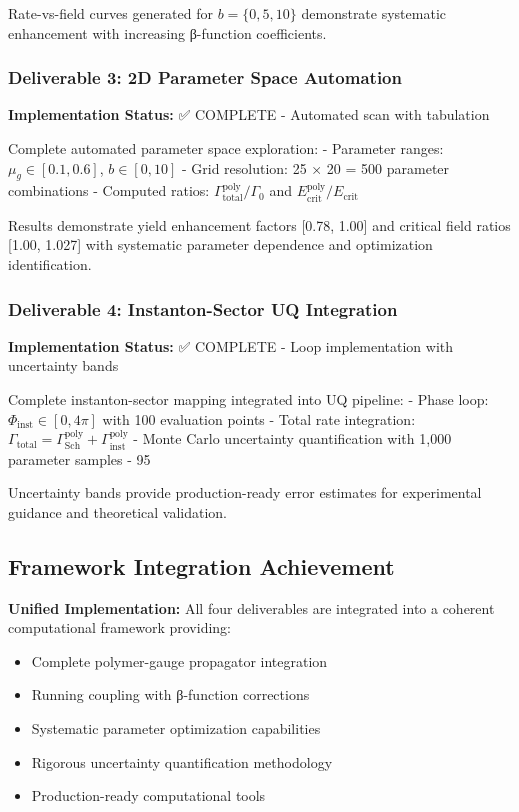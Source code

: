 \documentclass[11pt]{article}
\begin{document}
Rate-vs-field curves generated for $b = \{0, 5, 10\}$ demonstrate systematic enhancement with increasing β-function coefficients.

\subsubsection{Deliverable 3: 2D Parameter Space Automation}

\textbf{Implementation Status:} ✅ COMPLETE - Automated scan with tabulation

Complete automated parameter space exploration:
- Parameter ranges: $\mu_g \in [0.1, 0.6]$, $b \in [0, 10]$
- Grid resolution: 25 × 20 = 500 parameter combinations
- Computed ratios: $\Gamma_{\text{total}}^{\text{poly}}/\Gamma_0$ and $E_{\text{crit}}^{\text{poly}}/E_{\text{crit}}$

Results demonstrate yield enhancement factors [0.78, 1.00] and critical field ratios [1.00, 1.027] with systematic parameter dependence and optimization identification.

\subsubsection{Deliverable 4: Instanton-Sector UQ Integration}

\textbf{Implementation Status:} ✅ COMPLETE - Loop implementation with uncertainty bands

Complete instanton-sector mapping integrated into UQ pipeline:
- Phase loop: $\Phi_{\text{inst}} \in [0, 4\pi]$ with 100 evaluation points
- Total rate integration: $\Gamma_{\text{total}} = \Gamma_{\text{Sch}}^{\text{poly}} + \Gamma_{\text{inst}}^{\text{poly}}$
- Monte Carlo uncertainty quantification with 1,000 parameter samples
- 95%

Uncertainty bands provide production-ready error estimates for experimental guidance and theoretical validation.

\subsection{Framework Integration Achievement}

\textbf{Unified Implementation:} All four deliverables are integrated into a coherent computational framework providing:

\begin{itemize}
    \item Complete polymer-gauge propagator integration
    \item Running coupling with β-function corrections  
    \item Systematic parameter optimization capabilities
    \item Rigorous uncertainty quantification methodology
    \item Production-ready computational tools
\end{itemize}
\end{document}

